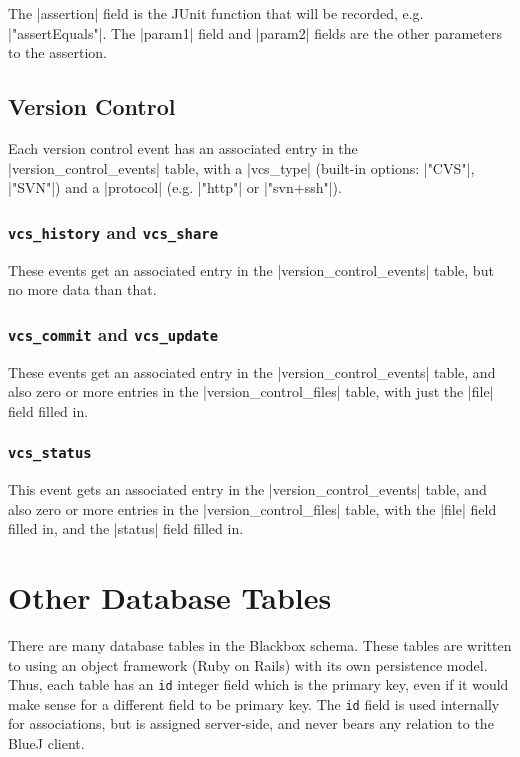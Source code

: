 \documentclass{book}
\begin{document}
The |assertion| field is the JUnit function that will be recorded,
e.g. |"assertEquals"|.  The |param1| field and |param2| fields are
the other parameters to the assertion.

\section{Version Control}



Each version control event has an associated entry in the
|version_control_events| table, with a |vcs_type| (built-in options:
|"CVS"|, |"SVN"|) and a |protocol| (e.g. |"http"| or |"svn+ssh"|).

\subsection{\lstinline|vcs_history| and \lstinline|vcs_share|}

These events get an associated entry in the |version_control_events|
table, but no more data than that.

\subsection{\lstinline|vcs_commit| and \lstinline|vcs_update|}

These events get an associated entry in the |version_control_events|
table, and also zero or more entries in the |version_control_files|
table, with just the |file| field filled in.

\subsection{\lstinline|vcs_status|}

This event gets an associated entry in the |version_control_events|
table, and also zero or more entries in the |version_control_files|
table, with the |file| field filled in, and the |status| field filled
in.

\chapter{Other Database Tables}

There are many database tables in the Blackbox schema.  These tables are
written to using an object framework (Ruby on Rails) with its own persistence
model.  Thus, each table has an \verb$id$ integer field which is the primary
key, even if it would make sense for a different field to be primary key.  The
\texttt{id} field is used internally for associations, but is assigned
server-side, and never bears any relation to the BlueJ client.
\end{document}
